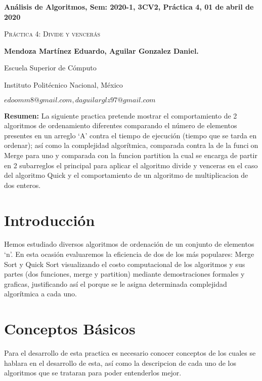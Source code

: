 \documentclass[12pt,twoside]{article}
\date{}
\begin{document}
\centerline{\bf An\'alisis de Algoritmos, Sem: 2020-1, 3CV2, Pr\'actica 4, 01 de abril de 2020}
\centerline{}
\centerline{}
\begin{center}
\Large{\textsc{Pr\'actica 4: Divide y vencerás}}
\end{center}
\centerline{}
\centerline{\bf {Mendoza Mart\'inez Eduardo, Aguilar Gonzalez Daniel.}}
\centerline{}
\centerline{Escuela Superior de C\'omputo}
\centerline{Instituto Polit\'ecnico Nacional, M\'exico}
\centerline{$edoomm8@gmail.com, daguilarglz97@gmail.com$}
\newtheorem{Theorem}{\quad Theorem}[section]
\newtheorem{Definition}[Theorem]{\quad Definition}
\newtheorem{Corollary}[Theorem]{\quad Corollary}
\newtheorem{Lemma}[Theorem]{\quad Lemma}
\newtheorem{Example}[Theorem]{\quad Example}
\bigskip
\textbf{Resumen:} La siguiente practica pretende mostrar el comportamiento de 2 algoritmos de ordenamiento diferentes comparando el n\'umero de elementos presentes en un arreglo `A' contra el tiempo de ejecuci\'on (tiempo que se tarda en ordenar); as\'i como la complejidad algor\'itmica, comparada contra la de la funcion Merge para uno y comparada con la funcion partition la cual se encarga de partir en 2 subarreglos el principal para aplicar el algoritmo divide y venceras en el caso del algoritmo Quick y el comportamiento de un algoritmo de multiplicacion de dos enteros.
\section{Introducci\'on}
Hemos estudiado diversos algoritmos de
ordenaci\'on de un conjunto de elementos `n'. En esta ocasi\'on evaluaremos
la eficiencia de dos de los m\'as populares: Merge Sort y Quick Sort visualizando el costo
computacional de los algoritmos y sus partes (dos funciones, merge y partition) mediante demostraciones formales y graficas, justificando as\'i el porque se le asigna determinada complejidad algor\'itmica a cada uno.
\section{Conceptos B\'asicos}
Para el desarrollo de esta practica es necesario conocer conceptos de los cuales se hablara en el desarrollo de esta, as\'i como la descripcion de cada uno de los algoritmos que se trataran para poder entenderlos mejor.
\end{document}

